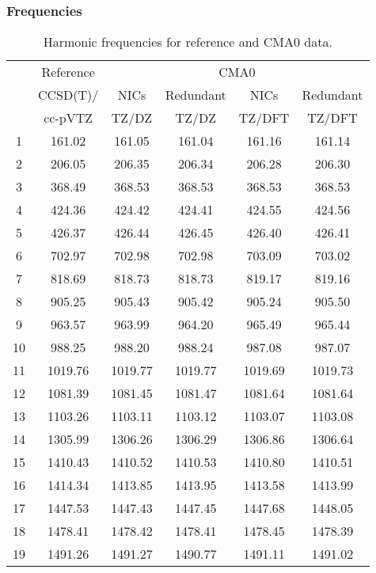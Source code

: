 \documentclass[10pt,oneside]{article}
\begin{document}
\begin{table}[h!]
\subsubsection*{Frequencies}
\centering
\caption{Harmonic frequencies for reference and CMA0 data.}
\begin{tabular}{cccccc}
\toprule
{} & Reference & \multicolumn{4}{c}{CMA0} \\
{} &  CCSD(T)/ &    NICs &  Redundant &    NICs & Redundant \\
{} &   cc-pVTZ &   TZ/DZ &      TZ/DZ &  TZ/DFT &    TZ/DFT \\
\midrule
1  &    161.02 &  161.05 &     161.04 &  161.16 &    161.14 \\
2  &    206.05 &  206.35 &     206.34 &  206.28 &    206.30 \\
3  &    368.49 &  368.53 &     368.53 &  368.53 &    368.53 \\
4  &    424.36 &  424.42 &     424.41 &  424.55 &    424.56 \\
5  &    426.37 &  426.44 &     426.45 &  426.40 &    426.41 \\
6  &    702.97 &  702.98 &     702.98 &  703.09 &    703.02 \\
7  &    818.69 &  818.73 &     818.73 &  819.17 &    819.16 \\
8  &    905.25 &  905.43 &     905.42 &  905.24 &    905.50 \\
9  &    963.57 &  963.99 &     964.20 &  965.49 &    965.44 \\
10 &    988.25 &  988.20 &     988.24 &  987.08 &    987.07 \\
11 &   1019.76 & 1019.77 &    1019.77 & 1019.69 &   1019.73 \\
12 &   1081.39 & 1081.45 &    1081.47 & 1081.64 &   1081.64 \\
13 &   1103.26 & 1103.11 &    1103.12 & 1103.07 &   1103.08 \\
14 &   1305.99 & 1306.26 &    1306.29 & 1306.86 &   1306.64 \\
15 &   1410.43 & 1410.52 &    1410.53 & 1410.80 &   1410.51 \\
16 &   1414.34 & 1413.85 &    1413.95 & 1413.58 &   1413.99 \\
17 &   1447.53 & 1447.43 &    1447.45 & 1447.68 &   1448.05 \\
18 &   1478.41 & 1478.42 &    1478.41 & 1478.45 &   1478.39 \\
19 &   1491.26 & 1491.27 &    1490.77 & 1491.11 &   1491.02 \\

\end{tabular}
\end{table}
\end{document}

